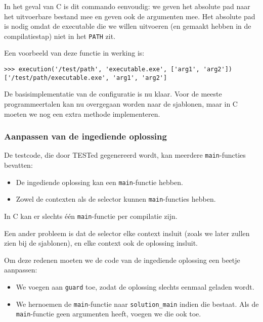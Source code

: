 In het geval van C is dit commando eenvoudig: we geven het absolute pad naar het uitvoerbare bestand mee en geven ook de argumenten mee.
Het absolute pad is nodig omdat de executable die we willen uitvoeren (en gemaakt hebben in de compilatiestap) niet in het \texttt{PATH} zit.

Een voorbeeld van deze functie in werking is:

\begin{verbatim}
>>> execution('/test/path', 'executable.exe', ['arg1', 'arg2'])
['/test/path/executable.exe', 'arg1', 'arg2']
\end{verbatim}

De basisimplementatie van de configuratie is nu klaar.
Voor de meeste programmeertalen kan nu overgegaan worden naar de sjablonen, maar in C moeten we nog een extra methode implementeren.

\subsubsection{Aanpassen van de ingediende oplossing}

De testcode, die door TESTed gegenereerd wordt, kan meerdere \texttt{main}-functies bevatten:

\begin{itemize}
    \item De ingediende oplossing kan een \texttt{main}-functie hebben.
    \item Zowel de contexten als de selector kunnen \texttt{main}-functies hebben.
\end{itemize}

In C kan er slechts één \texttt{main}-functie per compilatie zijn.

Een ander probleem is dat de selector elke context insluit (zoals we later zullen zien bij de sjablonen), en elke context ook de oplossing insluit.

Om deze redenen moeten we de code van de ingediende oplossing een beetje aanpassen:

\begin{itemize}
    \item We voegen aan \texttt{guard} toe, zodat de oplossing slechts eenmaal geladen wordt.
    \item We hernoemen de \texttt{main}-functie naar \texttt{solution\_main} indien die bestaat.
    Als de \texttt{main}-functie geen argumenten heeft, voegen we die ook toe.
\end{itemize}

